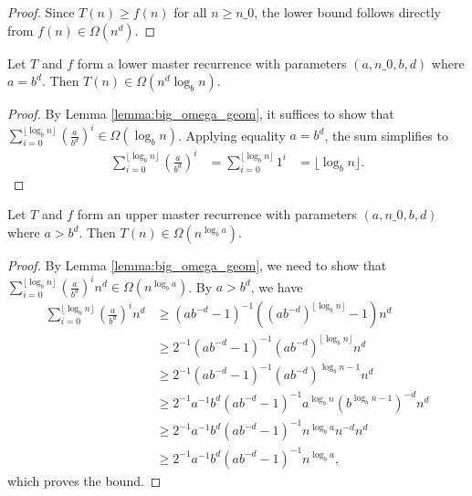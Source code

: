 \begin{proof}
    \leanok
    Since $T(n) \geq f(n)$ for all $n \ge n\_0$, the lower bound follows 
    directly from $f(n) \in \Omega(n^d)$.
\end{proof}

\begin{theorem}
    \label{thm:big_omega_of_eq}
    \leanok
    Let $T$ and $f$ form a lower master recurrence with parameters 
    $(a, n\_0, b, d)$ where $a = b^d$. Then $T(n) \in \Omega(n^d \log_b{n})$.
\end{theorem}

\begin{proof}
    \leanok
    By Lemma \ref{lemma:big_omega_geom}, it suffices to show that
    $\sum_{i=0}^{\lfloor \log_b{n} \rfloor} (\frac{a}{b^d})^i \in 
    \Omega(\log_b{n})$. Applying equality $a = b^d$, the sum simplifies to
    \begin{align*}
        \sum_{i=0}^{\lfloor \log_b{n} \rfloor} (\frac{a}{b^d})^i &= 
            \sum_{i=0}^{\lfloor \log_b{n} \rfloor} 1^i &=
            \lfloor \log_b{n} \rfloor.
    \end{align*}
\end{proof}

\begin{theorem}
    \label{thm:big_omega_of_gt}
    \leanok
    Let $T$ and $f$ form an upper master recurrence with parameters 
    $(a, n\_0, b, d)$ where $a > b^d$. Then $T(n) \in \Omega(n^{\log_b{a}})$.
\end{theorem}

\begin{proof}
    \leanok
    By Lemma \ref{lemma:big_omega_geom}, we need to show that 
    $\sum_{i=0}^{\lfloor \log_b{n} \rfloor} (\frac{a}{b^d})^i n^d
    \in \Omega(n^{\log_b{a}})$. By $a > b^d$, we have 
    \begin{align*}
        \sum_{i=0}^{\lfloor \log_b{n} \rfloor} (\frac{a}{b^d})^i n^d 
        &\geq (a b^{-d} - 1)^{-1}
            ((a b^{-d})^{\lfloor \log_b{n} \rfloor} - 1) n^d \\
        &\geq 2^{-1} (a b^{-d} - 1)^{-1}
            (a b^{-d})^{\lfloor \log_b{n} \rfloor} n^d \\
        &\geq 2^{-1} (a b^{-d} - 1)^{-1} (a b^{-d})^{\log_b{n} - 1} n^d \\
        &\geq 2^{-1} a^{-1} b^d (a b^{-d} - 1)^{-1} a^{\log_b{n}} 
            (b^{\log_b{n} - 1})^{-d} n^d \\
        &\geq 2^{-1} a^{-1} b^d (a b^{-d} - 1)^{-1} n^{\log_b{a}} n^{-d} n^d \\
        &\geq 2^{-1} a^{-1} b^d (a b^{-d} - 1)^{-1} n^{\log_b{a}},
    \end{align*}
    which proves the bound.
\end{proof}


